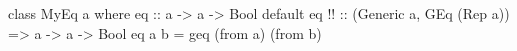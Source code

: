 \begin{code}
class MyEq a where
  eq :: a -> a -> Bool
  default eq  !!
      :: (Generic a, GEq (Rep a))
      => a
      -> a
      -> Bool
  eq a b = geq (from a) (from b)
\end{code}
